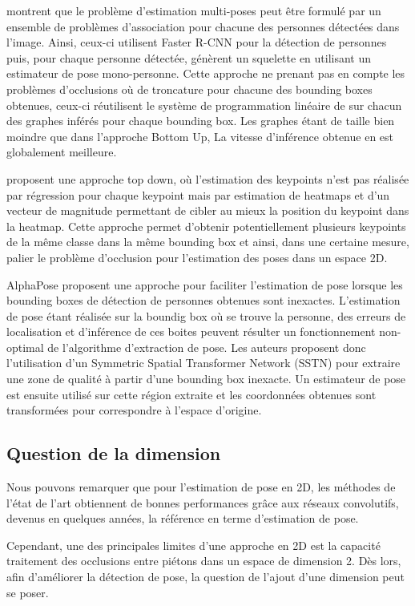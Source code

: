 \cite{2016arXiv160808526I} montrent que le problème d'estimation multi-poses peut être formulé par un ensemble de problèmes d'association pour chacune des personnes détectées dans l'image. Ainsi, ceux-ci utilisent Faster R-CNN pour la détection de personnes puis, pour chaque personne détectée, génèrent un squelette en utilisant un estimateur de pose mono-personne. Cette approche ne prenant pas en compte les problèmes d'occlusions où de troncature pour chacune des bounding boxes obtenues, ceux-ci réutilisent le système de programmation linéaire de \cite{2015arXiv151106645P} sur chacun des graphes inférés pour chaque bounding box. Les graphes étant de taille bien moindre que dans l'approche Bottom Up, La vitesse d'inférence obtenue en est globalement meilleure.

\cite{2017arXiv170101779P} proposent une approche top down, où l'estimation des keypoints n'est pas réalisée par régression pour chaque keypoint mais par estimation de heatmaps et d'un vecteur de magnitude permettant de cibler au mieux la position du keypoint dans la heatmap. Cette approche permet d'obtenir potentiellement plusieurs keypoints de la même classe dans la même bounding box et ainsi, dans une certaine mesure, palier le problème d'occlusion pour l'estimation des poses dans un espace 2D. 

AlphaPose \cite{fang2017rmpe} proposent une approche pour faciliter l'estimation de pose lorsque les bounding boxes de détection de personnes obtenues sont inexactes. L'estimation de pose étant réalisée sur la boundig box où se trouve la personne, des erreurs de localisation et d'inférence de ces boites peuvent résulter un fonctionnement non-optimal de l'algorithme d'extraction de pose. Les auteurs proposent donc l'utilisation d'un Symmetric Spatial Transformer Network (SSTN) pour extraire une zone de qualité à partir d'une bounding box inexacte. Un estimateur de pose est ensuite utilisé sur cette région extraite et les coordonnées obtenues sont transformées pour correspondre à l'espace d'origine.


\subsection{Question de la dimension}
Nous pouvons remarquer que pour l'estimation de pose en 2D, les méthodes de l'état de l'art obtiennent de bonnes performances grâce aux réseaux convolutifs, devenus en quelques années, la référence en terme d'estimation de pose.

Cependant, une des principales limites d'une approche en 2D est la capacité traitement des occlusions entre piétons dans un espace de dimension 2. Dès lors, afin d'améliorer la détection de pose, la question de l'ajout d'une dimension peut se poser.

